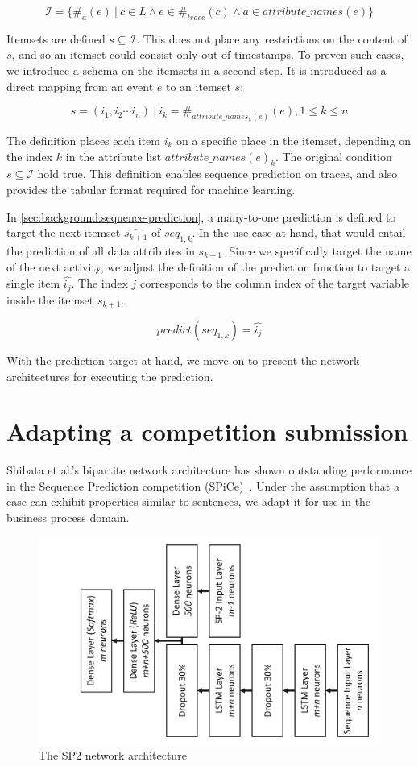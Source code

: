 $$\mathscr{I} = \{\#_{a}(e)\ |\ c \in L\wedge e \in \#_{trace}(c) \wedge a \in attribute\_names(e)\}$$

Itemsets are defined $s \subseteq \mathscr{I}$.
This does not place any restrictions on the content of $s$,
and so an itemset could consist only out of timestamps.
To preven such cases, we introduce a schema on the itemsets in a second step.
It is introduced as a direct mapping from an event $e$ to an itemset $s$:

$$ s = (i_1, i_2 \cdots i_n)\ |\ i_k = \#_{attribute\_names_k(e)}(e), 1 \leq k \leq n $$

The definition places each item $i_k$ on a specific place in the itemset, depending on the index $k$ in the attribute list $attribute\_names(e)_k$.
The original condition $s \subseteq \mathscr{I}$ hold true.
This definition enables sequence prediction on traces, and also provides the tabular format required for machine learning.

In \autoref{sec:background:sequence-prediction}, a many-to-one prediction is defined to target the next itemset $\widehat{s_{k+1}}$ of $seq_{1,k}$.
In the use case at hand, that would entail the prediction of all data attributes in $s_{k+1}$.
Since we specifically target the name of the next activity, we adjust the definition of the prediction function to target a single item $\hat{i_j}$. The index $j$ corresponds to the column index of the target variable inside the itemset $s_{k+1}$.

$$ predict(seq_{1,k}) = \hat{i_j} $$

With the prediction target at hand, we move on to present the network architectures for executing the prediction.

\section{Adapting a competition submission}\label{sec:contrib:sp2-inspiration}
Shibata et al.'s bipartite network architecture has shown outstanding performance in the Sequence Prediction competition (SPiCe)~\cite{web:spice}.
Under the assumption that a case can exhibit properties similar to sentences, we adapt it for use in the business process domain.

\begin{figure}[!htb]
    \centering
    \includegraphics[width=.8\textwidth, angle=-90,origin=c]{gfx/sp2-network-architecture.pdf}
    \caption{The SP2 network architecture}
    \label{fig:sp2-architecture}
\end{figure}

